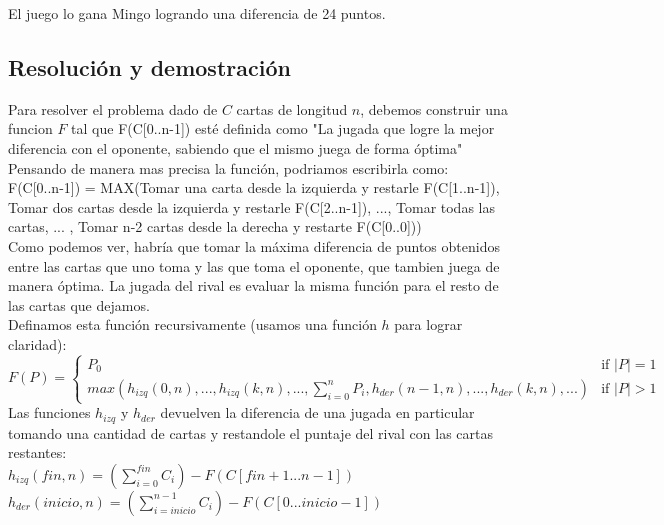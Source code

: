 El juego lo gana Mingo logrando una diferencia de 24 puntos.

\subsection{Resoluci\'on y demostraci\'on}

Para resolver el problema dado de $C$ cartas de longitud $n$, debemos construir una funcion $F$ tal que F(C[0..n-1]) est\'e definida como "La jugada que logre la mejor diferencia con el oponente, sabiendo que el mismo juega de forma \'optima" \\

Pensando de manera mas precisa la funci\'on, podriamos escribirla como: \\

F(C[0..n-1]) = MAX(Tomar una carta desde la izquierda y restarle F(C[1..n-1]), Tomar dos cartas desde la izquierda y restarle F(C[2..n-1]), ..., Tomar todas las cartas, ... , Tomar n-2 cartas desde la derecha y restarte F(C[0..0])) \\

Como podemos ver, habr\'ia que tomar la m\'axima diferencia de puntos obtenidos entre las cartas que uno toma y las que toma el oponente, que tambien juega de manera \'optima. La jugada del rival es evaluar la misma funci\'on para el resto de las cartas que dejamos. \\

Definamos esta funci\'on recursivamente (usamos una funci\'on $h$ para lograr claridad): \\

$
F(P) =
\left\{
	\begin{array}{ll}
		P_{0}  & \mbox{if } |P| = 1 \\
		max( h_{izq} (0, n), ... , h_{izq} (k, n) , ... , \sum\limits_{i=0}^n P_{i} , h_{der} (n-1, n), ... , h_{der} (k, n) , ... )  & \mbox{if } |P| > 1
	\end{array}
\right.
$ \\

Las funciones $h_{izq}$ y $h_{der}$ devuelven la diferencia de una jugada en particular tomando una cantidad de cartas y restandole el puntaje del rival con las cartas restantes: \\

$h_{izq}(fin, n) =  (\sum\limits_{i=0}^{fin} C_{i}) - F(C[fin+1...n-1])$ \\
$h_{der}(inicio, n) =  (\sum\limits_{i=inicio}^{n-1} C_{i}) - F(C[0...inicio-1])$\\

